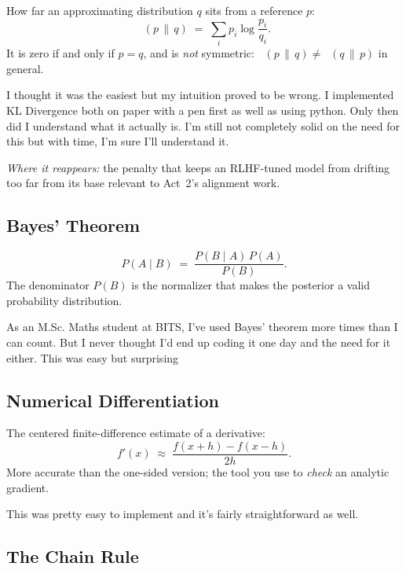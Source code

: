 \documentclass[11pt,a4paper]{article}
\DeclareMathOperator{\DKL}{D_{KL}}
\begin{document}
How far an approximating distribution $q$ sits from a reference $p$:
\[
  \DKL(p \,\|\, q) \;=\; \sum_{i} p_{i} \log \frac{p_{i}}{q_{i}}.
\]
It is zero if and only if $p = q$, and is \emph{not} symmetric:
$\DKL(p \,\|\, q) \neq \DKL(q \,\|\, p)$ in general.

I thought it was the easiest but my intuition proved to be wrong. I implemented KL Divergence both on paper with a pen first as well as using python. Only then did I understand what it actually is. I'm still not completely solid on the need for this but with time, I'm sure I'll understand it.

\medskip
\noindent\emph{Where it reappears:} the penalty that keeps an RLHF-tuned
model from drifting too far from its base \textemdash{} relevant to Act~2's alignment work.

\subsection{Bayes' Theorem}
\label{subsec:bayes}

\[
  P(A \mid B) \;=\; \frac{P(B \mid A)\, P(A)}{P(B)}.
\]
The denominator $P(B)$ is the normalizer that makes the posterior a valid
probability distribution.

As an M.Sc. Maths student at BITS, I've used Bayes' theorem more times than I can count. But I never thought I'd end up coding it one day and the need for it either. This was easy but surprising

\subsection{Numerical Differentiation}
\label{subsec:numerical-diff}

The centered finite-difference estimate of a derivative:
\[
  f'(x) \;\approx\; \frac{f(x+h) - f(x-h)}{2h}.
\]
More accurate than the one-sided version; the tool you use to
\emph{check} an analytic gradient.

This was pretty easy to implement and it's fairly straightforward as well.

\subsection{The Chain Rule}
\label{subsec:chain-rule}
\end{document}
